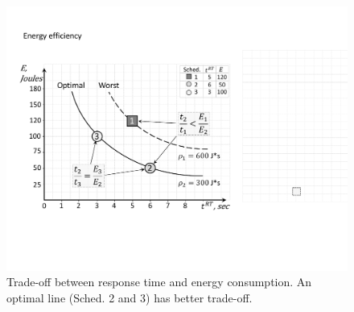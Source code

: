 \begin{figure}
\centering
\includegraphics[width=.7\columnwidth]{figs/EDPExample.pdf}
\caption{Trade-off between response time and energy consumption. An optimal line (Sched. 2 and 3) has better trade-off.}
\label{fig:EDPExample}
\end{figure}




